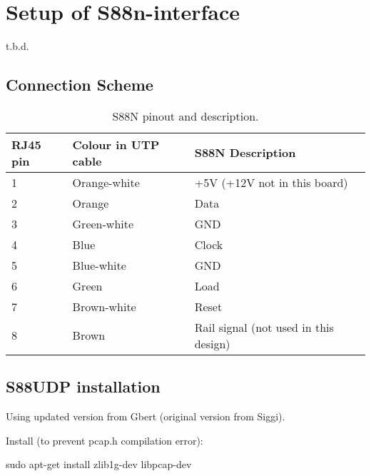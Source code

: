 \section{Setup of S88n-interface}
t.b.d.

\subsection{Connection Scheme}
	


\begin{table}[]
	\caption{S88N pinout and description.}
	\label{tab:my-table}
	\begin{tabular}{|l|l|l|}
		\hline
		\rowcolor[HTML]{9B9B9B} 
		\textbf{RJ45 pin} & \textbf{Colour in UTP cable} & \textbf{S88N Description}             \\ \hline
		1                 & Orange-white                 & +5V (+12V not in this board)          \\ \hline
		2                 & Orange                       & Data                                  \\ \hline
		3                 & Green-white                  & GND                                   \\ \hline
		4                 & Blue                         & Clock                                 \\ \hline
		5                 & Blue-white                   & GND                                   \\ \hline
		6                 & Green                        & Load                                  \\ \hline
		7                 & Brown-white                  & Reset                                 \\ \hline
		8                 & Brown                        & Rail signal (not used in this design) \\ \hline
	\end{tabular}
\end{table}

\subsection{S88UDP installation}
Using updated version from Gbert (original version from Siggi).


Install (to prevent pcap.h compilation error):

sudo apt-get install zlib1g-dev libpcap-dev

